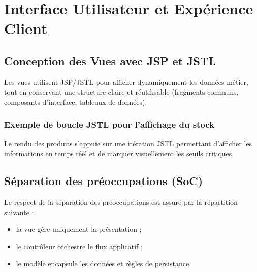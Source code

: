 \documentclass[12pt,a4paper]{report}
\begin{document}
\begin{center}
\end{center}

\chapter{Interface Utilisateur et Expérience Client}

\section{Conception des Vues avec JSP et JSTL}
Les vues utilisent JSP/JSTL pour afficher dynamiquement les données métier, tout en conservant une structure claire et réutilisable (fragments communs, composants d'interface, tableaux de données).

\subsection{Exemple de boucle JSTL pour l'affichage du stock}
Le rendu des produits s'appuie sur une itération JSTL permettant d'afficher les informations en temps réel et de marquer visuellement les seuils critiques.

\section{Séparation des préoccupations (SoC)}
Le respect de la séparation des préoccupations est assuré par la répartition suivante :
\begin{itemize}
    \item la vue gère uniquement la présentation ;
    \item le contrôleur orchestre le flux applicatif ;
    \item le modèle encapsule les données et règles de persistance.
\end{itemize}
\end{document}
